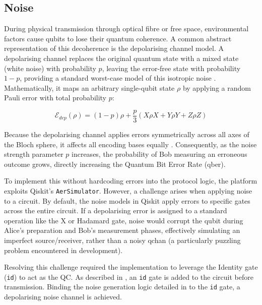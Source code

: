 \subsection{Noise}
\label{subsec:noise}
During physical transmission through optical fibre or free space, environmental factors cause qubits to lose their quantum coherence. A common abstract representation of this decoherence is the depolarising channel model. A depolarising channel replaces the original quantum state with a mixed state (white noise) with probability $p$, leaving the error-free state with probability $1-p$, providing a standard worst-case model of this isotropic noise \cite{QKDbible}. Mathematically, it maps an arbitrary single-qubit state $\rho$ by applying a random Pauli error with total probability $p$:

\begin{equation}
\label{eq:depolarising}
\mathcal{E}_{dep}(\rho) = (1-p)\rho + \frac{p}{3}(X\rho X + Y\rho Y + Z\rho Z)
\end{equation}

Because the depolarising channel applies errors symmetrically across all axes of the Bloch sphere, it affects all encoding bases equally \cite{QKDbible}. Consequently, as the noise strength parameter $p$ increases, the probability of Bob measuring an erroneous outcome grows, directly increasing the Quantum Bit Error Rate (\gls{qber}).

To implement this without hardcoding errors into the protocol logic, the platform exploits Qiskit's \texttt{AerSimulator}. However, a challenge arises when applying noise to a circuit. By default, the noise models in Qiskit apply errors to specific gates across the entire circuit. If a depolarising error is assigned to a standard operation like the X or Hadamard gate, noise would corrupt the qubit during Alice's preparation and Bob's measurement phases, effectively simulating an imperfect source/receiver, rather than a noisy \gls{qchan} (a particularly puzzling problem encountered in development).

Resolving this challenge required the implementation to leverage the Identity gate (\texttt{id}) to act as the QC. As described in , an \texttt{id} gate is added to the circuit before transmission. Binding the noise generation logic detailed in  to the \texttt{id} gate, a depolarising noise channel is achieved.

